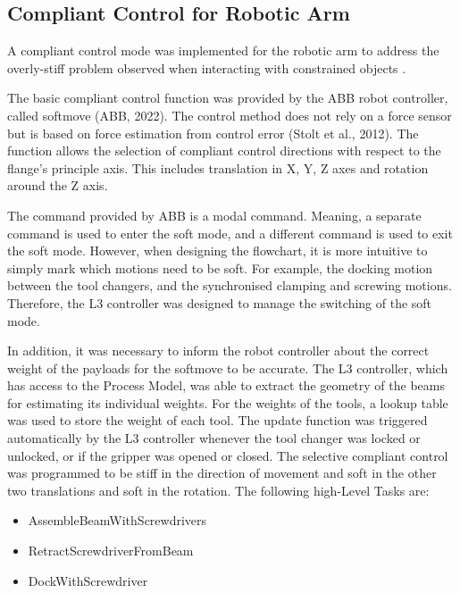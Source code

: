 \FloatBarrier

\subsection{Compliant Control for Robotic Arm}
\label{subsection:exploration-4-compliant-control-for-robotic-arm}

A compliant control mode was implemented for the robotic arm to address the overly-stiff problem observed when interacting with constrained objects .

The basic compliant control function was provided by the ABB robot controller, called softmove (ABB, 2022). The control method does not rely on a force sensor but is based on force estimation from control error (Stolt et al., 2012). The function allows the selection of compliant control directions with respect to the flange’s principle axis. This includes translation in X, Y, Z axes and rotation around the Z axis. 

The command provided by ABB is a modal command. Meaning, a separate command is used to enter the soft mode, and a different command is used to exit the soft mode. However, when designing the flowchart, it is more intuitive to simply mark which motions need to be soft. For example, the docking motion between the tool changers, and the synchronised clamping and screwing motions. Therefore, the L3 controller was designed to manage the switching of the soft mode. 

In addition, it was necessary to inform the robot controller about the correct weight of the payloads for the softmove to be accurate. The L3 controller, which has access to the Process Model, was able to extract the geometry of the beams for estimating its individual weights. For the weights of the tools, a lookup table was used to store the weight of each tool. The update function was triggered automatically by the L3 controller whenever the tool changer was locked or unlocked, or if the gripper was opened or closed. 
The selective compliant control was programmed to be stiff in the direction of movement and soft in the other two translations and soft in the rotation. The following high-Level Tasks are: 
\begin{itemize}
    \item AssembleBeamWithScrewdrivers
    \item RetractScrewdriverFromBeam
    \item DockWithScrewdriver
\end{itemize}

